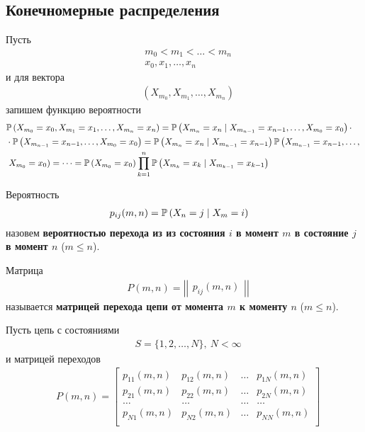 \subsection{Конечномерные распределения}
Пусть
\begin{align*}
  & m_0 < m_1 < \dots < m_n \\
  & x_0, x_1, \dots, x_n
\end{align*}
и для вектора
\begin{align*}
  & \left( X_{m_0}, X_{m_1}, \dots, X_{m_n} \right)
\end{align*}
запишем функцию вероятности
\begin{align*}
  & \mathbb{P} \left( X_{m_0}=x_0, X_{m_1}=x_1, \dots, X_{m_n}=x_n \right) = \mathbb{P}\left( X_{m_n} = x_n \mid X_{m_{n-1}} = x_{n-1}, \dots, X_{m_0} = x_0 \right)\cdot \\
  & \cdot \mathbb{P}\left( X_{m_{n-1}} = x_{n-1}, \dots, X_{m_0} = x_0 \right) = \mathbb{P}\left( X_{m_n} = x_n \mid X_{m_{n-1}} = x_{n-1}\right)\mathbb{P}\left( X_{m_{n-1}} = x_{n-1}, \dots, \right. \\
  & \left. X_{m_0} = x_0 \right) = \dots = \mathbb{P}\left( X_{m_0} = x_0 \right) \prod_{k=1}^n \mathbb{P}\left( X_{m_k} = x_{k} \mid X_{m_{k-1}} = x_{k-1} \right)
\end{align*}
\begin{Def}
    Вероятность
    \begin{align*}
      & p_{ij}(m,n) = \mathbb{P} \left( X_n=j \mid X_{m} = i\right)
    \end{align*}
    назовем \textbf{вероятностью перехода из из состояния $i$ в момент $m$ в
      состояние $j$ в момент $n$} ($m \leq n$).
\end{Def}
\begin{Def}
    Матрица
    \begin{align*}
      & P(m,n) = \left| \left| \begin{matrix} p_{ij}(m,n) \end{matrix} \right| \right|
    \end{align*}
    называется \textbf{матрицей перехода цепи от момента $m$ к моменту $n$} ($m \leq n$).
\end{Def}
\begin{example}
    Пусть цепь с состояниями
    \begin{align*}
      & S = \{1, 2, \dots, N\}, \ N < \infty
    \end{align*}
    и матрицей переходов
    \begin{align*}
      & P(m,n) = \left[ \begin{matrix}
              p_{11}(m,n) & p_{12}(m,n) & \dots & p_{1N}(m,n) \\
              p_{21}(m,n) & p_{22}(m,n) & \dots & p_{2N}(m,n) \\
              \dots & \dots & \dots & \dots \\
              p_{N1}(m,n) & p_{N2}(m,n) & \dots & p_{NN}(m,n) \\
          \end{matrix} \right]
    \end{align*}
\end{example}
